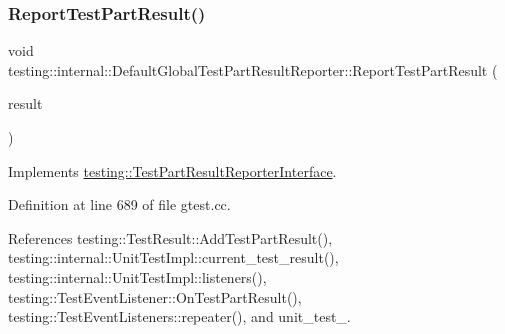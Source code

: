 \subsubsection{\texorpdfstring{Report\+Test\+Part\+Result()}{ReportTestPartResult()}}
{\footnotesize\ttfamily void testing\+::internal\+::\+Default\+Global\+Test\+Part\+Result\+Reporter\+::\+Report\+Test\+Part\+Result (\begin{DoxyParamCaption}\item[{const \hyperlink{classtesting_1_1TestPartResult}{Test\+Part\+Result} \&}]{result }\end{DoxyParamCaption})\hspace{0.3cm}{\ttfamily [virtual]}}



Implements \hyperlink{classtesting_1_1TestPartResultReporterInterface_aa2f920e7a5a0a6d0faf19e3727928c22}{testing\+::\+Test\+Part\+Result\+Reporter\+Interface}.



Definition at line 689 of file gtest.\+cc.



References testing\+::\+Test\+Result\+::\+Add\+Test\+Part\+Result(), testing\+::internal\+::\+Unit\+Test\+Impl\+::current\+\_\+test\+\_\+result(), testing\+::internal\+::\+Unit\+Test\+Impl\+::listeners(), testing\+::\+Test\+Event\+Listener\+::\+On\+Test\+Part\+Result(), testing\+::\+Test\+Event\+Listeners\+::repeater(), and unit\+\_\+test\+\_\+.


